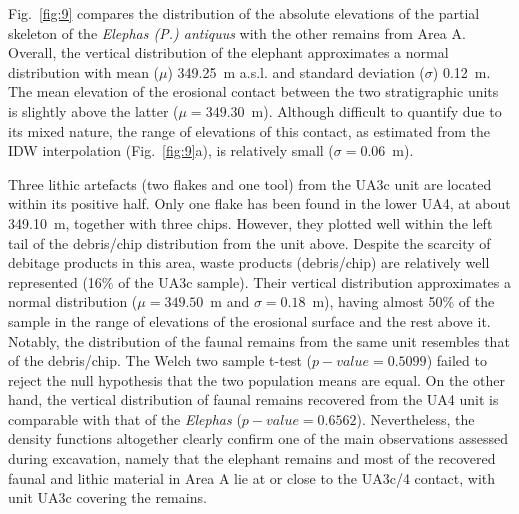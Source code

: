 \documentclass[preprint,authoryear,times]{elsarticle} %
\begin{document}
Fig.~\ref{fig:9} compares the distribution of the absolute elevations of the partial skeleton of the \emph{Elephas (P.) antiquus} with the other remains from Area A. Overall, the vertical distribution of the elephant approximates a normal distribution with mean ($\mu$) 349.25~m a.s.l. and standard deviation ($\sigma$) 0.12~m. The mean elevation of the erosional contact between the two stratigraphic units is slightly above the latter ($\mu=349.30$~m). Although difficult to quantify due to its mixed nature, the range of elevations of this contact, as estimated from the IDW interpolation (Fig.~\ref{fig:9}a), is relatively small ($\sigma=0.06$~m).

Three lithic artefacts (two flakes and one tool) from the UA3c unit are located within its positive half. Only one flake has been found in the lower UA4, at about 349.10~m, together with three chips. However, they plotted well within the left tail of the debris/chip distribution from the unit above. Despite the scarcity of debitage products in this area, waste products (debris/chip) are relatively well represented (16\% of the UA3c sample). Their vertical distribution approximates a normal distribution ($\mu=349.50$~m and $\sigma=0.18$~m), having almost 50\% of the sample in the range of elevations of the erosional surface and the rest above it. Notably, the distribution of the faunal remains from the same unit resembles that of the debris/chip. The Welch two sample t-test ($p-value=0.5099$) failed to reject the null hypothesis that the two population means are equal. On the other hand, the vertical distribution of faunal remains recovered from the UA4 unit is comparable with that of the \emph{Elephas} ($p-value=0.6562$).
Nevertheless, the density functions altogether clearly confirm one of the main observations assessed during excavation, namely that the elephant remains and most of the recovered faunal and lithic material in Area A lie at or close to the UA3c/4 contact, with unit UA3c covering the remains.
\end{document}

